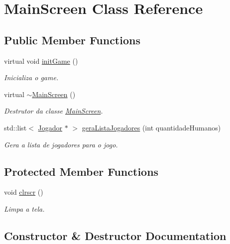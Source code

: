 \hypertarget{class_main_screen}{}\section{Main\+Screen Class Reference}
\label{class_main_screen}
\subsection*{Public Member Functions}
\begin{DoxyCompactItemize}
\item 
virtual void \mbox{\hyperlink{class_main_screen_a26e54b5922d5ffec7483309a14d0f55a}{init\+Game}} ()
\begin{DoxyCompactList}\small\item\em Inicializa o game. \end{DoxyCompactList}\item 
virtual \mbox{\hyperlink{class_main_screen_a9485c4c0e8cfdda86f385cc6096154e3}{$\sim$\+Main\+Screen}} ()
\begin{DoxyCompactList}\small\item\em Destrutor da classe \mbox{\hyperlink{class_main_screen}{Main\+Screen}}. \end{DoxyCompactList}\item 
std\+::list$<$ \mbox{\hyperlink{class_jogador}{Jogador}} $\ast$ $>$ \mbox{\hyperlink{class_main_screen_a03afd01f1c0be9b08757f33c8d324ac2}{gera\+Lista\+Jogadores}} (int quantidade\+Humanos)
\begin{DoxyCompactList}\small\item\em Gera a lista de jogadores para o jogo. \end{DoxyCompactList}\end{DoxyCompactItemize}
\subsection*{Protected Member Functions}
\begin{DoxyCompactItemize}
\item 
void \mbox{\hyperlink{class_main_screen_ac3fa0644a44436d74b96c68064edbcb4}{clrscr}} ()
\begin{DoxyCompactList}\small\item\em Limpa a tela. \end{DoxyCompactList}\end{DoxyCompactItemize}


\subsection{Constructor \& Destructor Documentation}
\mbox{\label{class_main_screen_a9485c4c0e8cfdda86f385cc6096154e3}} 
